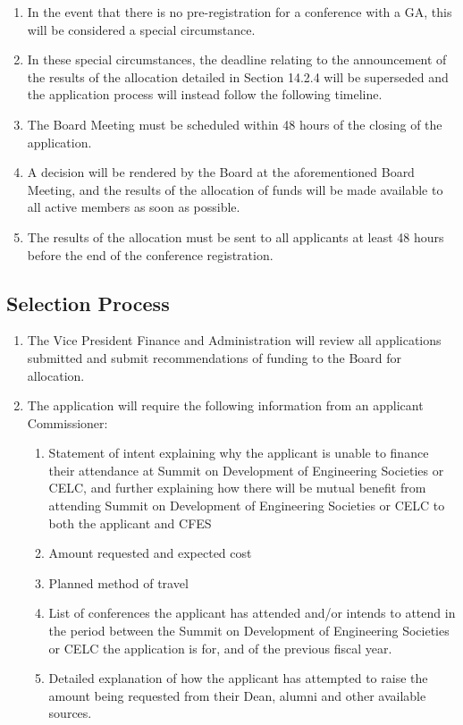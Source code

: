 \begin{enumerate}
 \item
  In the event that there is no pre-registration for a conference with a GA, this will be considered a special circumstance.
 \item
  In these special circumstances, the deadline relating to the announcement of the results of the allocation detailed in Section 14.2.4 will be superseded and the application process will instead follow the following timeline.
 \item
  The Board Meeting must be scheduled within 48 hours of the closing of the application.
 \item
  A decision will be rendered by the Board at the aforementioned Board Meeting, and the results of the allocation of funds will be made available to all active members as soon as possible.
 \item
  The results of the allocation must be sent to all applicants at least 48 hours before the end of the conference registration.
\end{enumerate}

\subsection{Selection Process}
\label{selection-process}

\begin{enumerate}
 \item
  The Vice President Finance and Administration will review all applications submitted and submit recommendations of funding to the Board for allocation.
 \item
  The application will require the following information from an applicant Commissioner:

  \begin{enumerate}
   \item
    Statement of intent explaining why the applicant is unable to finance their attendance at Summit on Development of Engineering Societies or CELC, and further explaining how there will be mutual benefit from attending Summit on Development of Engineering Societies or CELC to both the applicant and CFES
   \item
    Amount requested and expected cost
   \item
    Planned method of travel
   \item
    List of conferences the applicant has attended and/or intends to attend in the period between the Summit on Development of Engineering Societies or CELC the application is for, and of the previous fiscal year.
   \item
    Detailed explanation of how the applicant has attempted to raise the amount being requested from their Dean, alumni and other available sources.
  \end{enumerate}

\end{enumerate}
